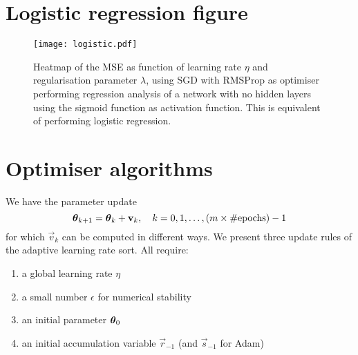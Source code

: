 \clearpage

\section{Logistic regression figure}\label{app:logistic}

\begin{figure}[h!]
    \texttt{[image: logistic.pdf]}
    \caption{Heatmap of the MSE as function of learning rate $\eta$ and regularisation parameter $\lambda$, using SGD with RMSProp as optimiser performing regression analysis of a network with no hidden layers using the sigmoid function as activation function. This is equivalent of performing logistic regression.}
    \label{fig:logistic_eta_lambda}
\end{figure}


\clearpage

\section{Optimiser algorithms}\label{app:optimisers}


We have the parameter update 
\begin{equation}\label{eq:update_rule_opt}
    \boldsymbol{\theta}_{k+1} = \boldsymbol{\theta}_k + \mathbf{v}_k, \quad k=0,1,\dots, (m\times\#\mathrm{epochs})-1
\end{equation}
for which $\vec{v}_k$ can be computed in different ways. We present three update rules of the adaptive learning rate sort. All require:
\begin{enumerate}[label=*]
    \item a global learning rate $\eta$
    \item a small number $\epsilon$ for numerical stability
    \item an initial parameter $\boldsymbol{\theta}_0$
    \item an initial accumulation variable $\vec{r}_{-1}$ (and $\vec{s}_{-1}$ for Adam)
\end{enumerate}


